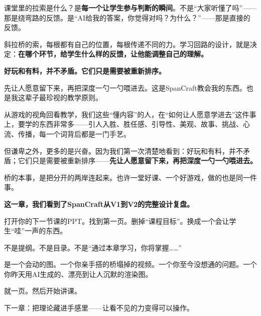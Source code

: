 课堂里的拉索是什么？是\textbf{每一个让学生参与判断的瞬间}。不是``大家听懂了吗''——那是绕弯路的反馈。是``AI给我的答案，你觉得对吗？为什么？''——那是直接的反馈。

斜拉桥的索，每根都有自己的位置，每根传递不同的力。学习回路的设计，就是决定：\textbf{在哪个环节，给学生什么样的反馈，让他能调整自己的理解。}

\begin{shiyu-note}
\label{note:chap7}

\textbf{好玩和有料，并不矛盾。它们只是需要被重新排序。}

先让人愿意留下来，再把深度一勺一勺喂进去。这是SpanCraft教会我的东西。也是我这辈子最珍视的教学原则。

从游戏的视角回看教学，我们这些``懂内容''的人，在``如何让人愿意学进去''这件事上，要学的东西非常多——引人入胜、胜任感、引导性、美观、故事、挑战、心流、传播，每一个词背后都是一门手艺。

但谦卑之外，更多的是兴奋。因为我们第一次清楚地看到：好玩和有料，并不矛盾；它们只是需要被重新排序——\textbf{先让人愿意留下来，再把深度一勺一勺喂进去。}

桥的本事，是把分开的两岸连起来。也许一堂好课、一个好游戏，做的也是同一件事。
\end{shiyu-note}

\vspace{1cm}

\begin{decision-point}
\label{decision:chap7}

\noindent\textbf{这一章，我们看到了SpanCraft从V1到V2的完整设计复盘。}

\vspace{0.3cm}

\noindent 打开你的下一节课的PPT。找到第一页。删掉``课程目标''。换成一个会让学生``哇''一声的东西。

\noindent 不是提纲。不是目录。不是``通过本章学习，你将掌握\ldots\ldots''

\noindent 是一个会动的图。一个你亲手搭的桥塌掉的视频。一个你至今没想通的问题。一个你昨天用AI生成的、漂亮到让人沉默的渲染图。

\noindent 就一页。然后开始讲课。
\end{decision-point}

\vspace{0.5cm}

\begin{flushright}
{\small\color{muted} 下一章：把理论藏进手感里——让看不见的力变得可以操作。}
\end{flushright}
